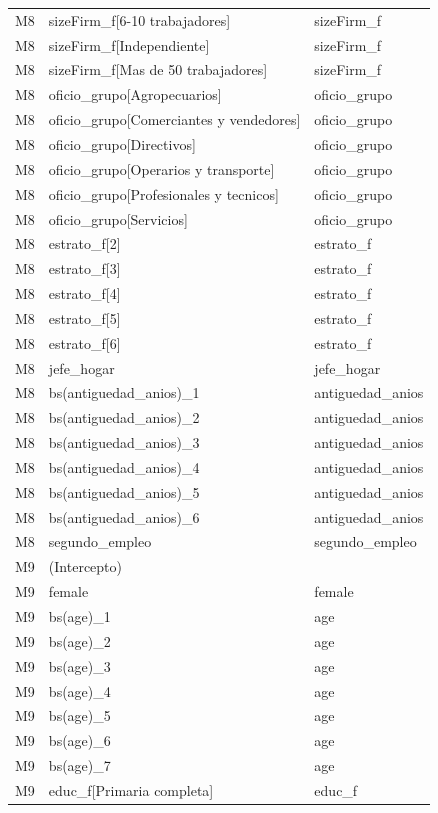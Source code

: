 \begin{longtable}{lll}
M8 & sizeFirm\_f[6-10 trabajadores] & sizeFirm\_f \\
M8 & sizeFirm\_f[Independiente] & sizeFirm\_f \\
M8 & sizeFirm\_f[Mas de 50 trabajadores] & sizeFirm\_f \\
M8 & oficio\_grupo[Agropecuarios] & oficio\_grupo \\
M8 & oficio\_grupo[Comerciantes y vendedores] & oficio\_grupo \\
M8 & oficio\_grupo[Directivos] & oficio\_grupo \\
M8 & oficio\_grupo[Operarios y transporte] & oficio\_grupo \\
M8 & oficio\_grupo[Profesionales y tecnicos] & oficio\_grupo \\
M8 & oficio\_grupo[Servicios] & oficio\_grupo \\
M8 & estrato\_f[2] & estrato\_f \\
M8 & estrato\_f[3] & estrato\_f \\
M8 & estrato\_f[4] & estrato\_f \\
M8 & estrato\_f[5] & estrato\_f \\
M8 & estrato\_f[6] & estrato\_f \\
M8 & jefe\_hogar & jefe\_hogar \\
M8 & bs(antiguedad\_anios)\_1 & antiguedad\_anios \\
M8 & bs(antiguedad\_anios)\_2 & antiguedad\_anios \\
M8 & bs(antiguedad\_anios)\_3 & antiguedad\_anios \\
M8 & bs(antiguedad\_anios)\_4 & antiguedad\_anios \\
M8 & bs(antiguedad\_anios)\_5 & antiguedad\_anios \\
M8 & bs(antiguedad\_anios)\_6 & antiguedad\_anios \\
M8 & segundo\_empleo & segundo\_empleo \\
M9 & (Intercepto) &  \\
M9 & female & female \\
M9 & bs(age)\_1 & age \\
M9 & bs(age)\_2 & age \\
M9 & bs(age)\_3 & age \\
M9 & bs(age)\_4 & age \\
M9 & bs(age)\_5 & age \\
M9 & bs(age)\_6 & age \\
M9 & bs(age)\_7 & age \\
M9 & educ\_f[Primaria completa] & educ\_f \\

\end{longtable}
